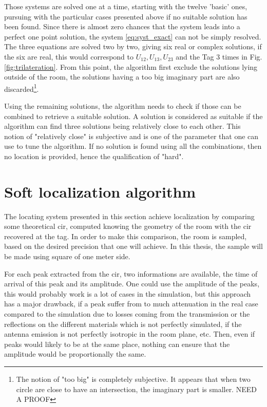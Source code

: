 Those systems are solved one at a time, starting with the twelve 'basic' ones, pursuing with the particular cases presented above if no suitable solution has been found. Since there is almost zero chances that the system leads into a perfect one point solution, the system \ref{eq:syst_exact} can not be simply resolved. The three equations are solved two by two, giving six real or complex solutions, if the six are real, this would correspond to $U_{12}, U_{13}, U_{23}$ and the Tag 3 times in Fig. \ref{fig:trilateration}. From this point, the algorithm first exclude the solutions lying outside of the room, the solutions having a too big imaginary part are also discarded\footnote{The notion of "too big" is completely subjective. It appears that when two circle are close to have an intersection, the imaginary part is smaller. \color{red} NEED A PROOF \color{black}}. 
\vspace{2mm}

Using the remaining solutions, the algorithm needs to check if those can be combined to retrieve a suitable solution. A solution is considered as suitable if the algorithm can find three solutions being relatively close to each other. This notion of "relatively close" is subjective and is one of the parameter that one can use to tune the algorithm. If no solution is found using all the combinations, then no location is provided, hence the qualification of "hard".
\vspace{2mm}

\section{Soft localization algorithm}
\label{soft_loc}

The locating system presented in this section achieve localization by comparing some theoretical \gls{cir}, computed knowing the geometry of the room with the \gls{cir} recovered at the tag. In order to make this comparison, the room is sampled, based on the desired precision that one will achieve. In this thesis, the sample will be made using square of one meter side.
\vspace{2mm}

For each peak extracted from the \gls{cir}, two informations are available, the time of arrival of this peak and its amplitude. One could use the amplitude of the peaks, this would probably work is a lot of cases in the simulation, but this approach has a major drawback, if a peak suffer from to much attenuation in the real case compared to the simulation due to losses coming from the transmission or the reflections on the different materials which is not perfectly simulated, if the antenna emission is not perfectly isotropic in the room plane, etc. Then, even if peaks would likely to be at the same place, nothing can ensure that the amplitude would be proportionally the same.
\vspace{2mm}

